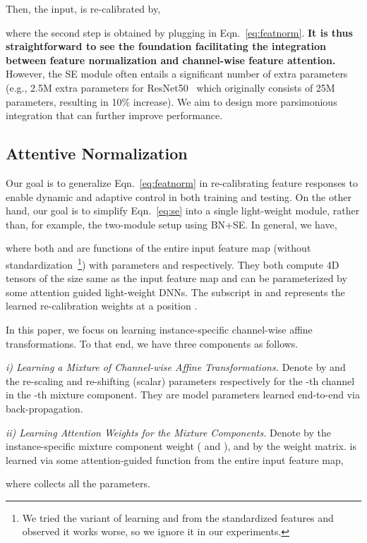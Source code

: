 \documentclass[runningheads]{llncs}
\begin{document}
Then, the input,  is re-calibrated by, 
    
where the second step is obtained by plugging in Eqn.~\ref{eq:featnorm}. \textbf{It is thus straightforward to see the foundation facilitating the integration between feature normalization and channel-wise feature attention.}
However, the SE module often entails a significant number of extra parameters (e.g., 2.5M extra parameters for ResNet50~\cite{ResidualNet} which originally consists of 25M parameters, resulting in 10\% increase). We aim to design more parsimonious integration that can further improve performance.

\subsection{Attentive Normalization}\label{sec:attnnorm}
Our goal is to generalize Eqn.~\ref{eq:featnorm} in re-calibrating feature responses to enable dynamic and adaptive control in both training and testing. On the other hand, our goal is to simplify Eqn.~\ref{eq:se} into a single light-weight module, rather than, for example, the two-module setup using BN+SE. In general, we have,

where both  and  are functions of the entire input feature map (without standardization~\footnote{We tried the variant of learning  and  from the standardized features and observed it works worse, so we ignore it in our experiments.}) with parameters  and  respectively. They both compute 4D tensors of the size same as the input feature map and can be parameterized by some attention guided light-weight DNNs. The subscript in  and  represents the learned re-calibration weights at a position . 

In this paper, we focus on learning instance-specific channel-wise affine transformations. To that end, we have three components as follows. 

\textit{i) Learning a Mixture of  Channel-wise Affine Transformations.} Denote by  and  the re-scaling and re-shifting (scalar) parameters respectively for the -th channel in the -th mixture component. They are model parameters learned end-to-end via back-propagation. 

\textit{ii) Learning Attention Weights for the  Mixture Components.}  Denote by  the instance-specific mixture component weight ( and ), and by  the  weight matrix.  is learned via some attention-guided function from the entire input feature map, 

where  collects all the parameters. 
\end{document}
